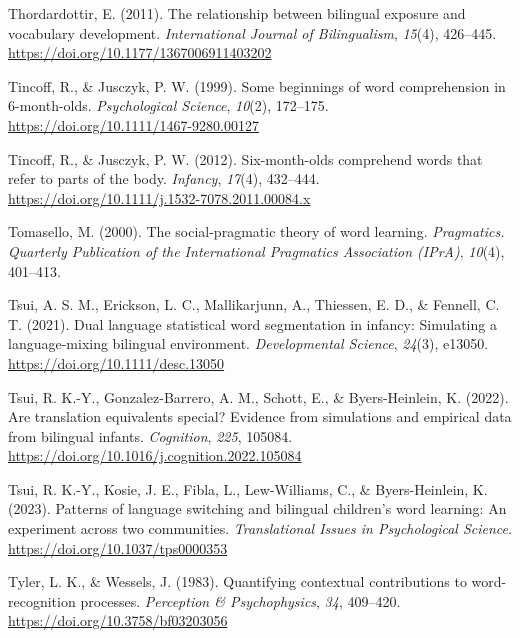 \documentclass[
  12pt,
  b5paperpaper,
  twoside]{scrreprt}
\newlength{\cslhangindent}
\newlength{\cslentryspacingunit} %
\newenvironment{CSLReferences}[2] %
 {%
  \setlength{\parindent}{0pt}
  \ifodd #1
  \let\oldpar\par
  \def\par{\hangindent=\cslhangindent\oldpar}
  \fi
  \setlength{\parskip}{#2\cslentryspacingunit}
 }%
 {}
\begin{document}
\begin{CSLReferences}{1}{0}
\leavevmode{}%
Thordardottir, E. (2011). The relationship between bilingual exposure
and vocabulary development. \emph{International Journal of
Bilingualism}, \emph{15}(4), 426--445.
\url{https://doi.org/10.1177/1367006911403202}

\leavevmode{}%
Tincoff, R., \& Jusczyk, P. W. (1999). Some beginnings of word
comprehension in 6-month-olds. \emph{Psychological Science},
\emph{10}(2), 172--175. \url{https://doi.org/10.1111/1467-9280.00127}

\leavevmode{}%
Tincoff, R., \& Jusczyk, P. W. (2012). Six-month-olds comprehend words
that refer to parts of the body. \emph{Infancy}, \emph{17}(4), 432--444.
\url{https://doi.org/10.1111/j.1532-7078.2011.00084.x}

\leavevmode{}%
Tomasello, M. (2000). The social-pragmatic theory of word learning.
\emph{Pragmatics. Quarterly Publication of the International Pragmatics
Association (IPrA)}, \emph{10}(4), 401--413.

\leavevmode{}%
Tsui, A. S. M., Erickson, L. C., Mallikarjunn, A., Thiessen, E. D., \&
Fennell, C. T. (2021). Dual language statistical word segmentation in
infancy: Simulating a language-mixing bilingual environment.
\emph{Developmental Science}, \emph{24}(3), e13050.
\url{https://doi.org/10.1111/desc.13050}

\leavevmode{}%
Tsui, R. K.-Y., Gonzalez-Barrero, A. M., Schott, E., \& Byers-Heinlein,
K. (2022). Are translation equivalents special? {Evidence} from
simulations and empirical data from bilingual infants. \emph{Cognition},
\emph{225}, 105084.
\url{https://doi.org/10.1016/j.cognition.2022.105084}

\leavevmode{}%
Tsui, R. K.-Y., Kosie, J. E., Fibla, L., Lew-Williams, C., \&
Byers-Heinlein, K. (2023). Patterns of language switching and bilingual
children's word learning: An experiment across two communities.
\emph{Translational Issues in Psychological Science}.
\url{https://doi.org/10.1037/tps0000353}

\leavevmode{}%
Tyler, L. K., \& Wessels, J. (1983). Quantifying contextual
contributions to word-recognition processes. \emph{Perception \&
Psychophysics}, \emph{34}, 409--420.
\url{https://doi.org/10.3758/bf03203056}


\end{CSLReferences}
\end{document}
